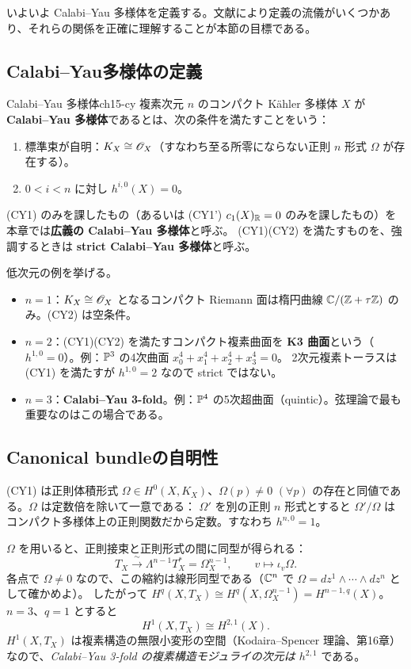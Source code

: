 いよいよ Calabi--Yau 多様体を定義する。文献により定義の流儀がいくつかあり、それらの関係を正確に理解することが本節の目標である。

\subsection{Calabi--Yau多様体の定義}

\begin{mydef}{Calabi--Yau 多様体}{ch15-cy}
複素次元 $n$ のコンパクト K\"ahler 多様体 $X$ が \textbf{Calabi--Yau 多様体}であるとは、次の条件を満たすことをいう：
\begin{enumerate}
\item[(CY1)] 標準束が自明：$K_X\cong\mathscr{O}_X$（すなわち至る所零にならない正則 $n$ 形式 $\Omega$ が存在する）。
\item[(CY2)] $0<i<n$ に対し $h^{i,0}(X) = 0$。
\end{enumerate}
(CY1) のみを課したもの（あるいは (CY1') $c_1(X)_{\mathbb{R}} = 0$ のみを課したもの）を本章では\textbf{広義の Calabi--Yau 多様体}と呼ぶ。
(CY1)(CY2) を満たすものを、強調するときは \textbf{strict Calabi--Yau 多様体}と呼ぶ。
\end{mydef}

低次元の例を挙げる。
\begin{itemize}
\item $n=1$：$K_X\cong\mathscr{O}_X$ となるコンパクト Riemann 面は楕円曲線 $\mathbb{C}/(\mathbb{Z}+\tau\mathbb{Z})$ のみ。(CY2) は空条件。
\item $n=2$：(CY1)(CY2) を満たすコンパクト複素曲面を \textbf{K3 曲面}という（$h^{1,0}=0$）。例：$\mathbb{P}^3$ の4次曲面 $x_0^4+x_1^4+x_2^4+x_3^4=0$。
2次元複素トーラスは (CY1) を満たすが $h^{1,0} = 2$ なので strict ではない。
\item $n=3$：\textbf{Calabi--Yau 3-fold}。例：$\mathbb{P}^4$ の5次超曲面（quintic）。弦理論で最も重要なのはこの場合である。
\end{itemize}

\subsection{Canonical bundleの自明性}

(CY1) は正則体積形式 $\Omega\in H^0(X,K_X)$、$\Omega(p)\neq0$ $(\forall p)$ の存在と同値である。$\Omega$ は定数倍を除いて一意である：
$\Omega'$ を別の正則 $n$ 形式とすると $\Omega'/\Omega$ はコンパクト多様体上の正則関数だから定数。すなわち $h^{n,0} = 1$。

$\Omega$ を用いると、正則接束と正則形式の間に同型が得られる：
\begin{equation}\label{eq:ch15-TOmega}
T_X\xrightarrow{\ \sim\ }\Lambda^{n-1}T^*_X = \Omega^{n-1}_X,\qquad v\mapsto \iota_v\Omega .
\end{equation}
各点で $\Omega\neq0$ なので、この縮約は線形同型である（$\mathbb{C}^n$ で $\Omega = dz^1\wedge\cdots\wedge dz^n$ として確かめよ）。
したがって $H^q(X,T_X)\cong H^q(X,\Omega^{n-1}_X) = H^{n-1,q}(X)$。$n=3$、$q=1$ とすると
\[
H^1(X,T_X)\cong H^{2,1}(X).
\]
$H^1(X,T_X)$ は複素構造の無限小変形の空間（Kodaira--Spencer 理論、第16章）なので、\emph{Calabi--Yau 3-fold の複素構造モジュライの次元は $h^{2,1}$} である。

